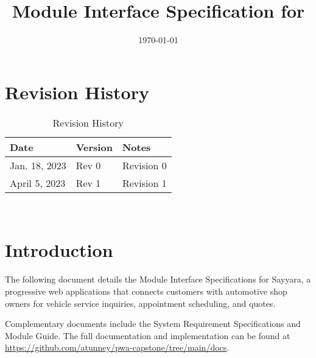 \documentclass[12pt, titlepage]{article}
\begin{document}
\title{Module Interface Specification for \progname{}}

\author{\authname}

\date{\today}

\maketitle


\section*{Revision History}

\begin{table}[H]
    \begin{tabularx}{\textwidth}{p{3cm}p{2cm}X}
    \toprule {\bf Date} & {\bf Version} & {\bf Notes}\\
    \midrule
    Jan. 18, 2023 & Rev 0 & Revision 0 \\
    April 5, 2023 & Rev 1 & Revision 1 \\
    \bottomrule
    \end{tabularx}
    \caption{Revision History}
\end{table}

~\newpage



\newpage

\tableofcontents

\listoftables

\newpage


\section{Introduction}

The following document details the Module Interface Specifications for Sayyara, a progressive web applications that connects customers with automotive shop owners for vehicle service inquiries, appointment scheduling, and quotes.

\noindent Complementary documents include the System Requirement Specifications
and Module Guide.  The full documentation and implementation can be
found at \url{https://github.com/atunney/pwa-capstone/tree/main/docs}.
\end{document}
